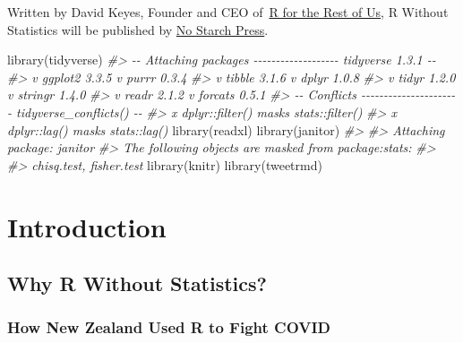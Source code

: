 \documentclass[
]{book}
\newenvironment{Shaded}{\begin{snugshade}}{\end{snugshade}}
\newcommand{\CommentTok}[1]{\textcolor[rgb]{0.56,0.35,0.01}{\textit{#1}}}
\newcommand{\FunctionTok}[1]{\textcolor[rgb]{0.00,0.00,0.00}{#1}}
\newcommand{\NormalTok}[1]{#1}
\begin{document}
Written by David Keyes, Founder and CEO of~\href{https://rfortherestofus.com/}{R for the Rest of Us}, R Without Statistics will be published by \href{https://nostarch.com/}{No Starch Press}.

\begin{Shaded}
\begin{Highlighting}[]
\FunctionTok{library}\NormalTok{(tidyverse)}
\CommentTok{\#\textgreater{} {-}{-} Attaching packages {-}{-}{-}{-}{-}{-}{-}{-}{-}{-}{-}{-}{-}{-}{-}{-}{-}{-}{-} tidyverse 1.3.1 {-}{-}}
\CommentTok{\#\textgreater{} v ggplot2 3.3.5     v purrr   0.3.4}
\CommentTok{\#\textgreater{} v tibble  3.1.6     v dplyr   1.0.8}
\CommentTok{\#\textgreater{} v tidyr   1.2.0     v stringr 1.4.0}
\CommentTok{\#\textgreater{} v readr   2.1.2     v forcats 0.5.1}
\CommentTok{\#\textgreater{} {-}{-} Conflicts {-}{-}{-}{-}{-}{-}{-}{-}{-}{-}{-}{-}{-}{-}{-}{-}{-}{-}{-}{-}{-}{-} tidyverse\_conflicts() {-}{-}}
\CommentTok{\#\textgreater{} x dplyr::filter() masks stats::filter()}
\CommentTok{\#\textgreater{} x dplyr::lag()    masks stats::lag()}
\FunctionTok{library}\NormalTok{(readxl)}
\FunctionTok{library}\NormalTok{(janitor)}
\CommentTok{\#\textgreater{} }
\CommentTok{\#\textgreater{} Attaching package: \textquotesingle{}janitor\textquotesingle{}}
\CommentTok{\#\textgreater{} The following objects are masked from \textquotesingle{}package:stats\textquotesingle{}:}
\CommentTok{\#\textgreater{} }
\CommentTok{\#\textgreater{}     chisq.test, fisher.test}
\FunctionTok{library}\NormalTok{(knitr)}
\FunctionTok{library}\NormalTok{(tweetrmd)}
\end{Highlighting}
\end{Shaded}

\hypertarget{part-introduction}{%
\part*{Introduction}\label{part-introduction}}

\hypertarget{why-r-without-statistics}{%
\chapter*{Why R Without Statistics?}\label{why-r-without-statistics}}

\hypertarget{how-new-zealand-used-r-to-fight-covid}{%
\section*{How New Zealand Used R to Fight COVID}\label{how-new-zealand-used-r-to-fight-covid}}
\end{document}
